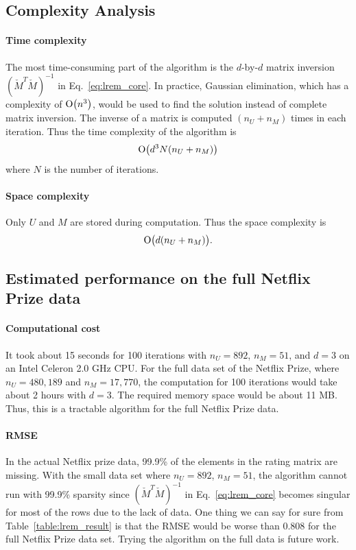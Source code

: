 \documentclass{article}
\begin{document}
\subsection{Complexity Analysis}
\paragraph{Time complexity} 
The most time-consuming part of the algorithm is the $d$-by-$d$ matrix
inversion $(\check{M}^T\check{M})^{-1}$ in Eq.~\ref{eq:lrem_core}. In
practice, Gaussian elimination, which has a complexity of $\operatorname{O}\bigl(n^3\bigr)$,
would be used to find the solution instead of complete matrix
inversion. The inverse of a matrix is computed $(n_U+n_M)$ times in
each iteration. Thus the time complexity of the algorithm is
\begin{equation}
\operatorname{O}\bigl(d^3N(n_U+n_M)\bigr)
\end{equation}
where $N$ is the number of iterations.

\paragraph{Space complexity}
Only $U$ and $M$ are stored during computation. Thus the space complexity is
\begin{equation}
\operatorname{O}\bigl(d(n_U+n_M)\bigr).
\end{equation}

\subsection{Estimated performance on the full Netflix Prize data}
\paragraph{Computational cost}
It took about 15 seconds for 100 iterations with $n_U=892$, $n_M=51$,
and $d=3$ on an Intel Celeron 2.0 GHz CPU. For the full data set of
the Netflix Prize, where $n_U=480,189$ and $n_M=17,770$, the
computation for 100 iterations would take about 2 hours with
$d=3$. The required memory space would be about 11 MB. Thus, this is a
tractable algorithm for the full Netflix Prize data.

\paragraph{RMSE}
In the actual Netflix prize data, 99.9\% of the elements in the rating
matrix are missing. With the small data set where $n_U=892$, $n_M=51$,
the algorithm cannot run with 99.9\% sparsity since
$(\check{M}^T\check{M})^{-1}$ in Eq.~\ref{eq:lrem_core} becomes
singular for most of the rows due to the lack of data. One thing we
can say for sure from Table~\ref{table:lrem_result} is that the RMSE
would be worse than 0.808 for the full Netflix Prize data set. Trying
the algorithm on the full data is future work.
\end{document}
